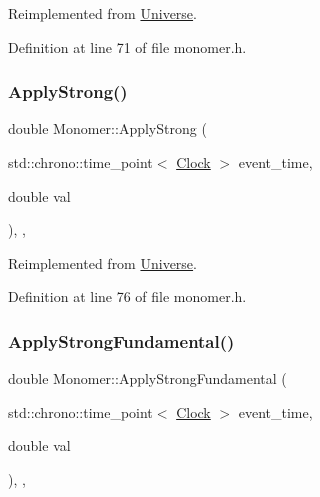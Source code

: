 Reimplemented from \mbox{\hyperlink{class_universe_a76c0b5e63c2a7d1988c44db341c3d64c}{Universe}}.



Definition at line 71 of file monomer.\+h.

\mbox{\label{class_monomer_acba5091693082fdf2d28f1a5a4ae19a1}} 
\subsubsection{\texorpdfstring{Apply\+Strong()}{ApplyStrong()}}
{\footnotesize\ttfamily double Monomer\+::\+Apply\+Strong (\begin{DoxyParamCaption}\item[{std\+::chrono\+::time\+\_\+point$<$ \mbox{\hyperlink{universe_8h_a0ef8d951d1ca5ab3cfaf7ab4c7a6fd80}{Clock}} $>$}]{event\+\_\+time,  }\item[{double}]{val }\end{DoxyParamCaption})\hspace{0.3cm}{\ttfamily [inline]}, {\ttfamily [final]}, {\ttfamily [virtual]}}



Reimplemented from \mbox{\hyperlink{class_universe_a906a88b37f10bfa630bef49dfd0e907a}{Universe}}.



Definition at line 76 of file monomer.\+h.

\mbox{\label{class_monomer_aa186454670f7796e196509238d419a35}} 
\subsubsection{\texorpdfstring{Apply\+Strong\+Fundamental()}{ApplyStrongFundamental()}}
{\footnotesize\ttfamily double Monomer\+::\+Apply\+Strong\+Fundamental (\begin{DoxyParamCaption}\item[{std\+::chrono\+::time\+\_\+point$<$ \mbox{\hyperlink{universe_8h_a0ef8d951d1ca5ab3cfaf7ab4c7a6fd80}{Clock}} $>$}]{event\+\_\+time,  }\item[{double}]{val }\end{DoxyParamCaption})\hspace{0.3cm}{\ttfamily [inline]}, {\ttfamily [final]}, {\ttfamily [virtual]}}



